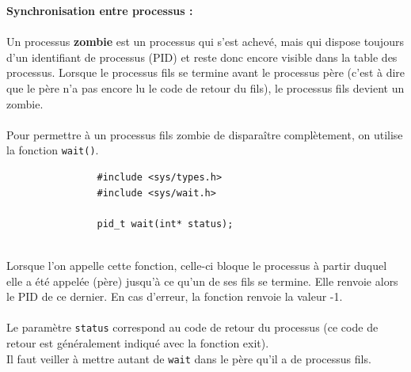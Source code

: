 		\begin{frame}[containsverbatim]
			\textbf{Synchronisation entre processus :}\\~\\
			Un processus \textbf{zombie} est un processus qui s'est achevé, mais qui dispose toujours d'un identifiant de processus (PID) et reste donc encore visible dans la table des processus. Lorsque le processus fils se termine avant le processus père (c'est à dire que le père n'a pas encore lu le code de retour du fils), le processus fils devient un zombie.
			\\~\\
			Pour permettre à un processus fils zombie de disparaître complètement, on utilise la fonction \lstinline!wait()!.\\
			\begin{lstlisting}
				#include <sys/types.h>
				#include <sys/wait.h>

				pid_t wait(int* status);
			\end{lstlisting}
			~\\
			Lorsque l'on appelle cette fonction, celle-ci bloque le processus à partir duquel elle a été appelée (père) jusqu'à ce qu'un de ses fils se termine. Elle renvoie alors le PID de ce dernier. En cas d'erreur, la fonction renvoie la valeur -1.
			\\~\\
			Le paramètre \lstinline!status! correspond au code de retour du processus (ce code de retour est généralement indiqué avec la fonction exit).\\
			Il faut veiller à mettre autant de \lstinline!wait! dans le père qu'il a de processus fils.\\
		\end{frame}	
		
